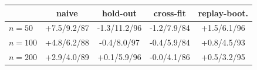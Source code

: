 \begin{tabular}{lcccc}
\toprule
 & naive & hold-out & cross-fit & replay-boot. \\
\midrule
$n{=}50$ & +7.5/9.2/87 & -1.3/11.2/96 & -1.2/7.9/84 & +1.5/6.1/96 \\
$n{=}100$ & +4.8/6.2/88 & -0.4/8.0/97 & -0.4/5.9/84 & +0.8/4.5/93 \\
$n{=}200$ & +2.9/4.0/89 & +0.1/5.9/96 & -0.0/4.1/86 & +0.5/3.2/95 \\
\bottomrule
\end{tabular}
